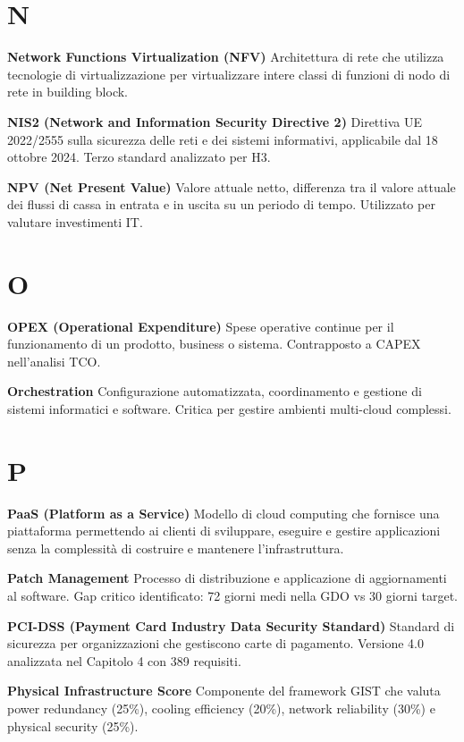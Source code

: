 \documentclass[12pt,a4paper,oneside]{book}
\numberwithin{figure}{chapter} %
\numberwithin{table}{chapter}  %
\begin{document}
\section{N}\label{n}

\textbf{Network Functions Virtualization (NFV)} Architettura di rete che
utilizza tecnologie di virtualizzazione per virtualizzare intere classi
di funzioni di nodo di rete in building block.

\textbf{NIS2 (Network and Information Security Directive 2)} Direttiva
UE 2022/2555 sulla sicurezza delle reti e dei sistemi informativi,
applicabile dal 18 ottobre 2024. Terzo standard analizzato per H3.

\textbf{NPV (Net Present Value)} Valore attuale netto, differenza tra il
valore attuale dei flussi di cassa in entrata e in uscita su un periodo
di tempo. Utilizzato per valutare investimenti IT.

\section{O}\label{o}

\textbf{OPEX (Operational Expenditure)} Spese operative continue per il
funzionamento di un prodotto, business o sistema. Contrapposto a CAPEX
nell'analisi TCO.

\textbf{Orchestration} Configurazione automatizzata, coordinamento e
gestione di sistemi informatici e software. Critica per gestire ambienti
multi-cloud complessi.

\section{P}\label{p}

\textbf{PaaS (Platform as a Service)} Modello di cloud computing che
fornisce una piattaforma permettendo ai clienti di sviluppare, eseguire
e gestire applicazioni senza la complessità di costruire e mantenere
l'infrastruttura.

\textbf{Patch Management} Processo di distribuzione e applicazione di
aggiornamenti al software. Gap critico identificato: 72 giorni medi
nella GDO vs 30 giorni target.

\textbf{PCI-DSS (Payment Card Industry Data Security Standard)} Standard
di sicurezza per organizzazioni che gestiscono carte di pagamento.
Versione 4.0 analizzata nel Capitolo 4 con 389 requisiti.

\textbf{Physical Infrastructure Score} Componente del framework GIST che
valuta power redundancy (25\%), cooling efficiency (20\%), network
reliability (30\%) e physical security (25\%).
\end{document}
